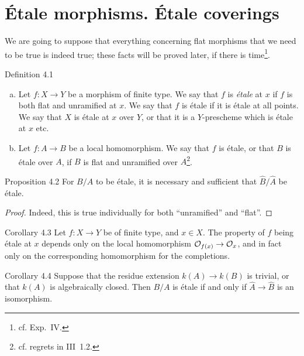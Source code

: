 \section{Étale morphisms. Étale coverings}
\label{I.4}

We are going to suppose that everything concerning flat morphisms that we need to be true is indeed true;
these facts will be proved later, if there is time\footnote{cf. Exp.~IV.}.

\begin{rmenv}{Definition 4.1}
  \begin{enumerate}[(a)]
    \item Let $f\colon X\to Y$ be a morphism of finite type.
      We say that $f$ is \emph{étale} at $x$ if $f$ is both flat and unramified at $x$.
      We say that $f$ is étale if it is étale at all points.
      We say that $X$ is étale at $x$ over $Y$, or that it is a $Y$-prescheme which is étale at $x$ etc.
    \item Let $f\colon A\to B$ be a local homomorphism.
      We say that $f$ is étale, or that $B$ is étale over $A$, if $B$ is flat and unramified over $A$\footnote{cf. regrets in III~1.2.}.
  \end{enumerate}
\end{rmenv}

\begin{itenv}{Proposition 4.2}
  For $B/A$ to be étale, it is necessary and sufficient that $\hat{B}/\hat{A}$ be étale.
\end{itenv}

\begin{proof}
  Indeed, this is true individually for both ``unramified'' and ``flat''.
\end{proof}

\begin{itenv}{Corollary 4.3}
  Let $f\colon X\to Y$ be of finite type, and $x\in X$.
  The property of $f$ being étale at $x$ depends only on the local homomorphism $\cal{O}_{f(x)}\to\cal{O}_x$, and in fact only on the corresponding homomorphism for the completions.
\end{itenv}

\begin{itenv}{Corollary 4.4}
  Suppose that the residue extension $k(A)\to k(B)$ is trivial, or that $k(A)$ is algebraically closed.
  Then $B/A$ is étale if and only if $\hat{A}\to\hat{B}$ is an isomorphism.
\end{itenv}

